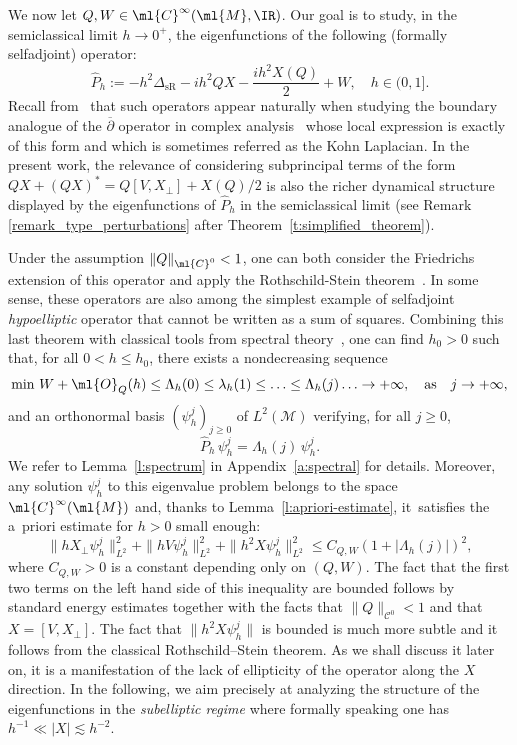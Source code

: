 \documentclass[10pt]{amsart}
\theoremstyle{plain}
\theoremstyle{definition}
\theoremstyle{remark}
\begin{document}
We now let $Q, W\in\ml{C}^{\infty}(\ml{M},\IR)$. Our goal is to study, in the semiclassical limit $h\to 0^+$, the eigenfunctions of the following (formally selfadjoint) operator:
\begin{equation}
\label{e:main_operator}
\widehat{P}_h:=-h^2\Delta_{\text{sR}}-ih^2QX -\frac{ih^2X(Q)}{2}+W, \quad h \in (0,1].
\end{equation}
Recall from~\cite[\S1]{RothschildStein76} that such operators appear naturally when studying the boundary analogue of the $\overline{\partial}$ operator in complex analysis~\cite{FollandStein74} whose local expression is exactly of this form and which is sometimes referred as the Kohn Laplacian. In the present work, the relevance of considering subprincipal terms of the form $QX+(QX)^*=Q[V,X_\perp]+X(Q)/2$ is also the richer dynamical structure displayed by the eigenfunctions of $\widehat{P}_h$ in the semiclassical limit (see Remark \ref{remark_type_perturbations} after Theorem~\ref{t:simplified_theorem}).

Under the assumption $\|Q\|_{\ml{C}^0}<1$, one can both consider the Friedrichs extension of this operator and apply the Rothschild-Stein theorem~\cite[Th.\,16]{RothschildStein76}. In some sense, these operators are also among the simplest example of selfadjoint \emph{hypoelliptic} operator that cannot be written as a sum of squares. Combining this last theorem with classical tools from spectral theory~\cite{ReedSimon80, ReedSimon75}, one can find $h_0 > 0$ such that, for all $0<h\leq h_0$, there exists a nondecreasing sequence
\[
\text{min}\ W+\ml{O}_Q(h)\leq \Lambda_h(0)\leq \lambda_h(1)\leq\ldots \leq \Lambda_h(j)\ldots \to +\infty,\quad\text{as}\quad j\to +\infty,
\]
and an orthonormal basis $(\psi_h^j)_{j\geq 0}$ of $L^2(\mathcal{M})$ verifying, for all $j\geq 0$,
\begin{equation}\label{e:semiclassical-basis}
\widehat{P}_h \, \psi_h^j =\Lambda_h(j) \,\psi_h^j.
\end{equation}
We refer to Lemma~\ref{l:spectrum} in Appendix~\ref{a:spectral} for details. Moreover, any solution $\psi_h^j$ to this eigenvalue problem belongs to the space $\ml{C}^{\infty}(\ml{M})$ and, thanks to Lemma~\ref{l:apriori-estimate}, it~satisfies the a~priori estimate for $h>0$ small enough:
\[
\|hX_\perp\psi_h^j\|_{L^2}^2+\|hV\psi_h^j\|_{L^2}^2+\|h^2X\psi_h^j\|_{L^2}^2\leq C_{Q,W}(1+|\Lambda_h(j)|)^2,
\]
where $C_{Q,W}>0$ is a constant depending only on $(Q,W)$. The fact that the first two terms on the left hand side of this inequality are bounded follows by standard energy estimates together with the facts that $\|Q\|_{\mathcal{C}^0}<1$ and that $X=[V,X_\perp]$. The fact that $\|h^2X\psi_h^j\|$ is bounded is much more subtle and it follows from the classical Rothschild--Stein theorem. As we shall discuss it later on, it is a manifestation of the lack of ellipticity of the operator along the $X$ direction. In the following, we aim precisely at analyzing the structure of the eigenfunctions in the \textit{subelliptic regime} where formally speaking one has $h^{-1}\ll |X|\lesssim h^{-2}$.
\end{document}
